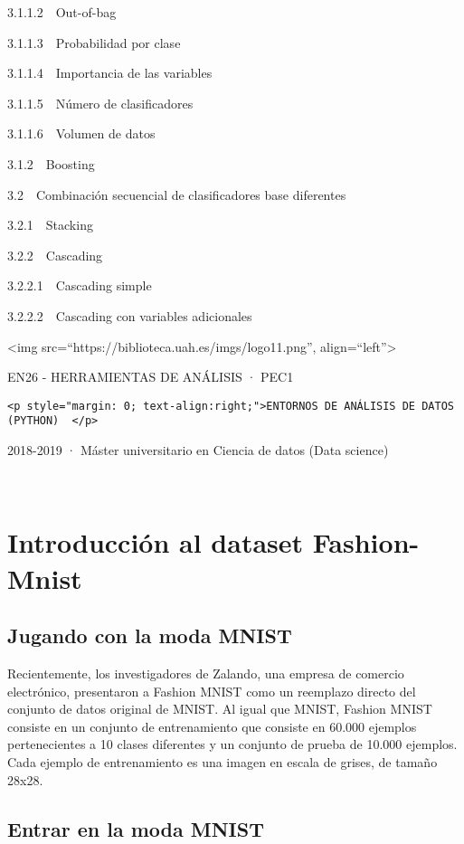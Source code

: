 \documentclass[11pt]{article}
\begin{document}
{{3.1.1.2~~}Out-of-bag}

{{3.1.1.3~~}Probabilidad por clase}

{{3.1.1.4~~}Importancia de las variables}

{{3.1.1.5~~}Número de clasificadores}

{{3.1.1.6~~}Volumen de datos}

{{3.1.2~~}Boosting}

{{3.2~~}Combinación secuencial de clasificadores base diferentes}

{{3.2.1~~}Stacking}

{{3.2.2~~}Cascading}

{{3.2.2.1~~}Cascading simple}

{{3.2.2.2~~}Cascading con variables adicionales}

    \textless{}img src=``https://biblioteca.uah.es/imgs/logo11.png'',
align=``left''\textgreater{}

EN26 - HERRAMIENTAS DE ANÁLISIS · PEC1

\begin{verbatim}
<p style="margin: 0; text-align:right;">ENTORNOS DE ANÁLISIS DE DATOS (PYTHON)  </p>
\end{verbatim}

2018-2019 · Máster universitario en Ciencia de datos (Data science)

~

\hypertarget{introducciuxf3n-al-dataset-fashion-mnist}{%
\section{Introducción al dataset
Fashion-Mnist}\label{introducciuxf3n-al-dataset-fashion-mnist}}

\hypertarget{jugando-con-la-moda-mnist}{%
\subsection{Jugando con la moda MNIST}\label{jugando-con-la-moda-mnist}}

Recientemente, los investigadores de Zalando, una empresa de comercio
electrónico, presentaron a Fashion MNIST como un reemplazo directo del
conjunto de datos original de MNIST. Al igual que MNIST, Fashion MNIST
consiste en un conjunto de entrenamiento que consiste en 60.000 ejemplos
pertenecientes a 10 clases diferentes y un conjunto de prueba de 10.000
ejemplos. Cada ejemplo de entrenamiento es una imagen en escala de
grises, de tamaño 28x28.

\hypertarget{entrar-en-la-moda-mnist}{%
\subsection{Entrar en la moda MNIST}\label{entrar-en-la-moda-mnist}}
\end{document}
